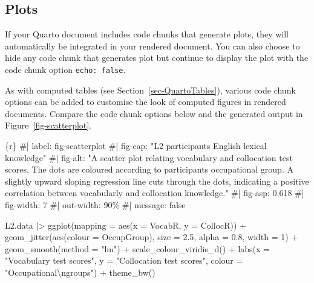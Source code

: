 \documentclass[
  letterpaper,
  DIV=11,
  numbers=noendperiod]{scrreprt}
\newenvironment{Shaded}{\begin{snugshade}}{\end{snugshade}}
\newcommand{\AttributeTok}[1]{\textcolor[rgb]{0.40,0.45,0.13}{#1}}
\newcommand{\CommentTok}[1]{\textcolor[rgb]{0.37,0.37,0.37}{#1}}
\newcommand{\DecValTok}[1]{\textcolor[rgb]{0.68,0.00,0.00}{#1}}
\newcommand{\FloatTok}[1]{\textcolor[rgb]{0.68,0.00,0.00}{#1}}
\newcommand{\FunctionTok}[1]{\textcolor[rgb]{0.28,0.35,0.67}{#1}}
\newcommand{\InformationTok}[1]{\textcolor[rgb]{0.37,0.37,0.37}{#1}}
\newcommand{\NormalTok}[1]{\textcolor[rgb]{0.00,0.23,0.31}{#1}}
\newcommand{\SpecialCharTok}[1]{\textcolor[rgb]{0.37,0.37,0.37}{#1}}
\newcommand{\StringTok}[1]{\textcolor[rgb]{0.13,0.47,0.30}{#1}}
\begin{document}
\subsection{Plots}\label{sec-QuartoPlots}

If your Quarto document includes code chunks that generate plots, they
will automatically be integrated in your rendered document. You can also
choose to hide any code chunk that generates plot but continue to
display the plot with the code chunk option \texttt{echo:\ false}.

As with computed tables (see Section~\ref{sec-QuartoTables}), various
code chunk options can be added to customise the look of computed
figures in rendered documents. Compare the code chunk options below and
the generated output in Figure~\ref{fig-scatterplot}.

\pagebreak

\begin{Shaded}
\begin{Highlighting}[]
\InformationTok{\textasciigrave{}\textasciigrave{}\textasciigrave{}\{r\}}
\CommentTok{\#| label: fig{-}scatterplot}
\CommentTok{\#| fig{-}cap: "L2 participants\textquotesingle{} English lexical knowledge"}
\CommentTok{\#| fig{-}alt: "A scatter plot relating vocabulary and collocation test scores. The dots are coloured according to participants\textquotesingle{} occupational group. A slightly upward sloping regression line cuts through the dots, indicating a positive correlation between vocabularly and collocation knowledge."}
\CommentTok{\#| fig{-}asp: 0.618}
\CommentTok{\#| fig{-}width: 7}
\CommentTok{\#| out{-}width: 90\%}
\CommentTok{\#| message: false}

\NormalTok{L2.data }\SpecialCharTok{|\textgreater{}} 
  \FunctionTok{ggplot}\NormalTok{(}\AttributeTok{mapping =} \FunctionTok{aes}\NormalTok{(}\AttributeTok{x =}\NormalTok{ VocabR, }\AttributeTok{y =}\NormalTok{ CollocR)) }\SpecialCharTok{+}
  \FunctionTok{geom\_jitter}\NormalTok{(}\FunctionTok{aes}\NormalTok{(}\AttributeTok{colour =}\NormalTok{ OccupGroup), }
              \AttributeTok{size =} \FloatTok{2.5}\NormalTok{, }\AttributeTok{alpha =} \FloatTok{0.8}\NormalTok{, }\AttributeTok{width =} \DecValTok{1}\NormalTok{) }\SpecialCharTok{+}
  \FunctionTok{geom\_smooth}\NormalTok{(}\AttributeTok{method =} \StringTok{"lm"}\NormalTok{) }\SpecialCharTok{+}
  \FunctionTok{scale\_colour\_viridis\_d}\NormalTok{() }\SpecialCharTok{+}
  \FunctionTok{labs}\NormalTok{(}\AttributeTok{x =} \StringTok{"Vocabulary test scores"}\NormalTok{,}
       \AttributeTok{y =} \StringTok{"Collocation test scores"}\NormalTok{,}
       \AttributeTok{colour =} \StringTok{"Occupational}\SpecialCharTok{\textbackslash{}n}\StringTok{groups"}\NormalTok{) }\SpecialCharTok{+}
  \FunctionTok{theme\_bw}\NormalTok{()}
\InformationTok{\textasciigrave{}\textasciigrave{}\textasciigrave{}}
\end{Highlighting}
\end{Shaded}
\end{document}
